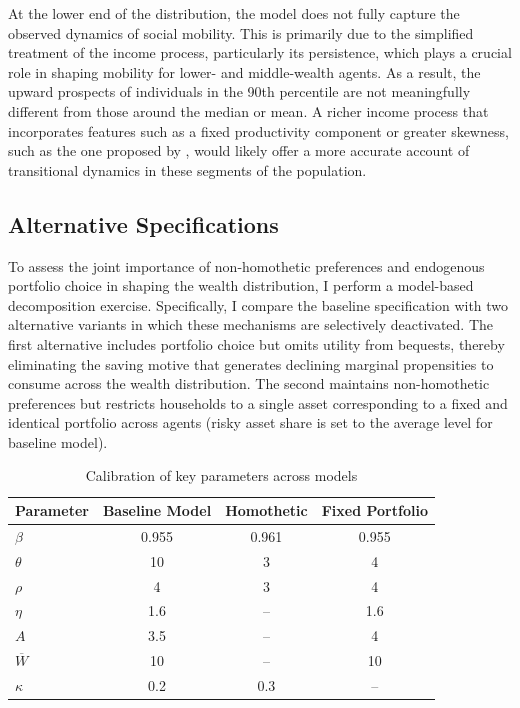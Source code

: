 \documentclass[12pt]{article}
\begin{document}
At the lower end of the distribution, the model does not fully capture the observed dynamics of social mobility. This is primarily due to the simplified treatment of the income process, particularly its persistence, which plays a crucial role in shaping mobility for lower- and middle-wealth agents. As a result, the upward prospects of individuals in the 90th percentile are not meaningfully different from those around the median or mean. A richer income process that incorporates features such as a fixed productivity component or greater skewness, such as the one proposed by \textcite{benhabib2019}, would likely offer a more accurate account of transitional dynamics in these segments of the population.

\subsection{Alternative Specifications}

To assess the joint importance of non-homothetic preferences and endogenous portfolio choice in shaping the wealth distribution, I perform a model-based decomposition exercise. Specifically, I compare the baseline specification with two alternative variants in which these mechanisms are selectively deactivated. The first alternative includes portfolio choice but omits utility from bequests, thereby eliminating the saving motive that generates declining marginal propensities to consume across the wealth distribution. The second maintains non-homothetic preferences but restricts households to a single asset corresponding to a fixed and identical portfolio across agents (risky asset share is set to the average level for baseline model).

\begin{table}[htbp]
\centering
\caption{Calibration of key parameters across models}
\label{tab:calibration_comparison}
\begin{tabular}{@{} lccc @{}}
\toprule
\textbf{Parameter} & \textbf{Baseline Model} & \textbf{Homothetic} & \textbf{Fixed Portfolio} \\
\midrule
$\beta$         & 0.955 & 0.961 & 0.955 \\
$\theta$        & 10    & 3     & 4     \\
$\rho$          & 4     & 3     & 4     \\
$\eta$          & 1.6   &  --   & 1.6   \\
$A$             & 3.5   &  --   & 4     \\
$\overline{W}$  & 10    &  --   & 10    \\
$\kappa$        & 0.2   & 0.3   &  --   \\
\bottomrule
\end{tabular}
\vspace{0.5em}
\end{table}
\end{document}
